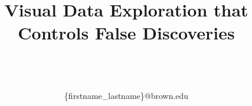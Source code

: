 \documentclass{sig}
\begin{document}
\title{Visual Data Exploration that Controls False Discoveries}

\author{
\alignauthor
\vspace*{-30pt}
\begin{tabular}{cccc}
\end{tabular}\\
\vspace{1.5mm}
\\
\vspace{0.75mm}
\{firstname\_lastname\}@brown.edu
}

\date{}
\maketitle

\begin{abstract}

\end{abstract}




%








\balance
\begin{scriptsize}


\end{scriptsize}
\end{document}
